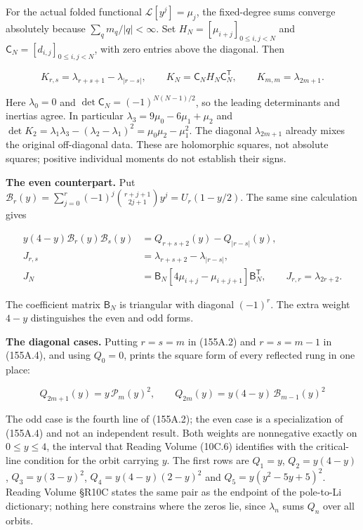 \documentclass[
  11pt,
]{book}
\begin{document}
For the actual folded functional \(\mathcal L[y^j]=\mu_j\), the
fixed-degree sums converge absolutely because \(\sum_qm_q/|q|<\infty\).
Set \(H_N=[\mu_{i+j}]_{0\le i,j<N}\) and
\(\mathsf C_N=[d_{i,j}]_{0\le i,j<N}\), with zero entries above the
diagonal. Then

\[
\boxed{K_{r,s}=\lambda_{r+s+1}-\lambda_{|r-s|},\qquad
 K_N=\mathsf C_NH_N\mathsf C_N^{\mathsf T},\qquad
 K_{m,m}=\lambda_{2m+1}.}
\tag{155A.3}
\]

Here \(\lambda_0=0\) and \(\det\mathsf C_N=(-1)^{N(N-1)/2}\), so the
leading determinants and inertias agree. In particular
\(\lambda_3=9\mu_0-6\mu_1+\mu_2\) and
\(\det K_2=\lambda_1\lambda_3-(\lambda_2-\lambda_1)^2
=\mu_0\mu_2-\mu_1^2\). The diagonal \(\lambda_{2m+1}\) already mixes the
original off-diagonal data. These are holomorphic squares, not absolute
squares; positive individual moments do not establish their signs.

\textbf{The even counterpart.} Put
\(\mathcal B_r(y)=\sum_{j=0}^r(-1)^j\binom{r+j+1}{2j+1}y^j
=U_r(1-y/2)\). The same sine calculation gives

\[
\begin{aligned}
y(4-y)\mathcal B_r(y)\mathcal B_s(y)
 &=Q_{r+s+2}(y)-Q_{|r-s|}(y),\\
J_{r,s}&=\lambda_{r+s+2}-\lambda_{|r-s|},\\
J_N&=\mathsf B_N[4\mu_{i+j}-\mu_{i+j+1}]\mathsf B_N^{\mathsf T},
\qquad J_{r,r}=\lambda_{2r+2}.
\end{aligned}
\tag{155A.4}
\]

The coefficient matrix \(\mathsf B_N\) is triangular with diagonal
\((-1)^r\). The extra weight \(4-y\) distinguishes the even and odd
forms.

\textbf{The diagonal cases.} Putting \(r=s=m\) in (155A.2) and
\(r=s=m-1\) in (155A.4), and using \(Q_0=0\), prints the square form of
every reflected rung in one place:

\[
\boxed{Q_{2m+1}(y)=y\,\mathcal P_m(y)^2,
\qquad
Q_{2m}(y)=y(4-y)\,\mathcal B_{m-1}(y)^2}
\tag{155A.4a}
\]

The odd case is the fourth line of (155A.2); the even case is a
specialization of (155A.4) and not an independent result. Both weights
are nonnegative exactly on \(0\le y\le4\), the interval that Reading
Volume (10C.6) identifies with the critical-line condition for the orbit
carrying \(y\). The first rows are \(Q_1=y\), \(Q_2=y(4-y)\),
\(Q_3=y(3-y)^2\), \(Q_4=y(4-y)(2-y)^2\) and \(Q_5=y(y^2-5y+5)^2\).
Reading Volume §R10C states the same pair as the endpoint of the
pole-to-Li dictionary; nothing here constrains where the zeros lie,
since \(\lambda_n\) sums \(Q_n\) over all orbits.
\end{document}
